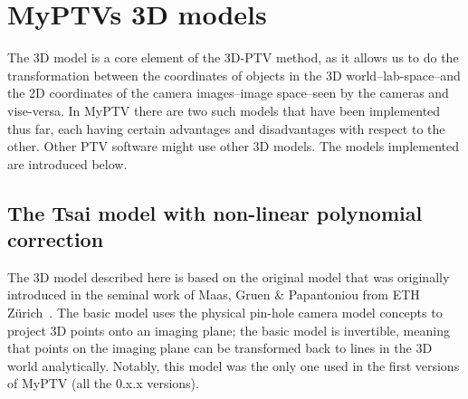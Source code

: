 \documentclass[10pt,a4paper]{article}
\begin{document}
\clearpage






\section{MyPTVs 3D models}


The 3D model is a core element of the 3D-PTV method, as it allows us to do the transformation between the coordinates of objects in the 3D world--lab-space--and the 2D coordinates of the camera images--image space--seen by the cameras and vise-versa. 
In MyPTV there are two such models that have been implemented thus far, each having certain advantages and disadvantages with respect to the other. Other PTV software might use other 3D models. The models implemented are introduced below.




\subsection{The Tsai model with non-linear polynomial correction}        


The 3D model described here is based on the original model that was originally introduced in the seminal work of Maas, Gruen \& Papantoniou from ETH Z\"{u}rich~\cite{Maas1993}.
The basic model uses the physical pin-hole camera model concepts to project 3D points onto an imaging plane; the basic model is invertible, meaning that points on the imaging plane can be transformed back to lines in the 3D world analytically. Notably, this model was the only one used in the first versions of MyPTV (all the 0.x.x versions).
\end{document}
